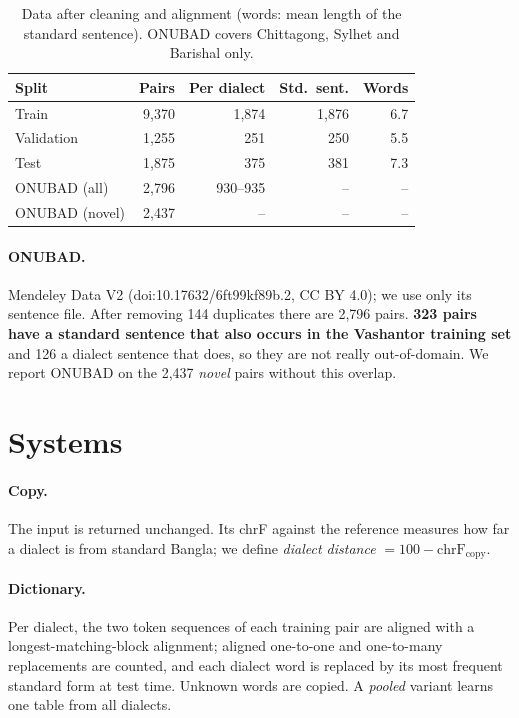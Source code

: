 \documentclass[10pt,twocolumn]{article}
\begin{document}
\begin{table}[t]\centering\footnotesize
\begin{tabular}{@{}lrrrr@{}}\toprule
Split & Pairs & Per dialect & Std.\ sent. & Words \\\midrule
Train & 9,370 & 1,874 & 1,876 & 6.7 \\
Validation & 1,255 & 251 & 250 & 5.5 \\
Test & 1,875 & 375 & 381 & 7.3 \\\midrule
ONUBAD (all) & 2,796 & 930--935 & -- & -- \\
ONUBAD (novel) & 2,437 & -- & -- & -- \\\bottomrule
\end{tabular}
\caption{Data after cleaning and alignment (words: mean length of the standard sentence). ONUBAD covers
Chittagong, Sylhet and Barishal only.}\label{tab:data}
\end{table}

\paragraph{ONUBAD.} Mendeley Data V2 (doi:10.17632/6ft99kf89b.2, CC BY 4.0); we use only its sentence
file. After removing 144 duplicates there are 2,796 pairs. \textbf{323 pairs have a standard sentence that
also occurs in the Vashantor training set} and 126 a dialect sentence that does, so they are not really
out-of-domain. We report ONUBAD on the 2,437 \emph{novel} pairs without this overlap.

\section{Systems}
\paragraph{Copy.} The input is returned unchanged. Its chrF against the reference measures how far a
dialect is from standard Bangla; we define \emph{dialect distance} $=100-\mathrm{chrF}_{\text{copy}}$.

\paragraph{Dictionary.} Per dialect, the two token sequences of each training pair are aligned with a
longest-matching-block alignment; aligned one-to-one and one-to-many replacements are counted, and each dialect
word is replaced by its most frequent standard form at test time. Unknown words are copied. A \emph{pooled}
variant learns one table from all dialects.
\end{document}
